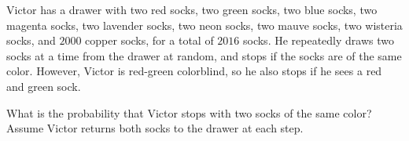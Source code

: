 Victor has a drawer with two red socks,
two green socks,
two blue socks,
two magenta socks,
two lavender socks,
two neon socks,
two mauve socks,
two wisteria socks,
and $2000$ copper socks,
for a total of $2016$ socks.
He repeatedly draws two socks at a time from the drawer at random, and stops if the socks are of the same color. However, Victor is red-green colorblind, so he also stops if he sees a red and green sock.

What is the probability that Victor stops with two socks of the same color? Assume Victor returns both socks to the drawer at each step.